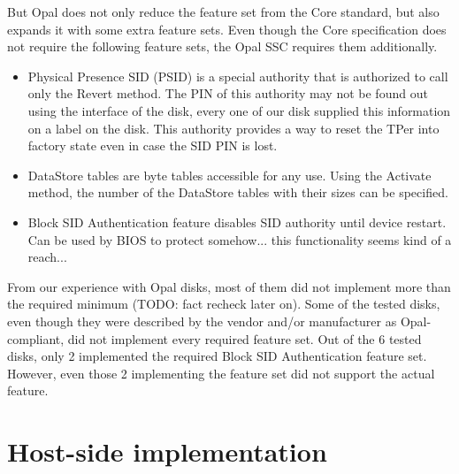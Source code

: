 But Opal does not only reduce the feature set from the Core standard, but also expands it with some extra feature sets. Even though the Core specification does not require the following feature sets, the Opal SSC requires them additionally.
\begin{itemize}
\item Physical Presence SID (PSID) is a special authority that is authorized to call only the Revert method. The PIN of this authority may not be found out using the interface of the disk, every one of our disk supplied this information on a label on the disk. This authority provides a way to reset the TPer into factory state even in case the SID PIN is lost.
\item DataStore tables are byte tables accessible for any use. Using the Activate method, the number of the DataStore tables with their sizes can be specified.
\item Block SID Authentication feature disables SID authority until device restart. Can be used by BIOS to protect somehow... this functionality seems kind of a reach...
\end{itemize}

From our experience with Opal disks, most of them did not implement more than the required minimum (TODO: fact recheck later on). Some of the tested disks, even though they were described by the vendor and/or manufacturer as Opal-compliant, did not implement every required feature set. Out of the 6 tested disks, only 2 implemented the required Block SID Authentication feature set. However, even those 2 implementing the feature set did not support the actual feature.




\section{Host-side implementation}

